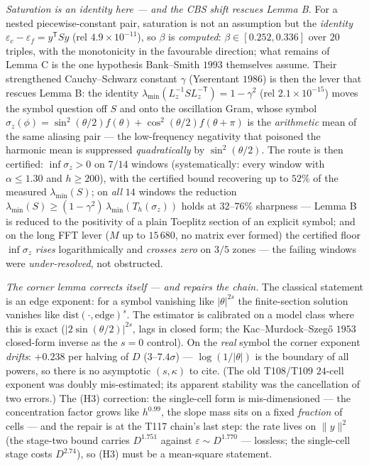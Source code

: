 \documentclass[11pt,a4paper]{article}
\begin{document}
\emph{Saturation is an identity here --- and the CBS shift rescues Lemma B.} For a nested
piecewise-constant pair, saturation is not an assumption but the \emph{identity}
$\varepsilon_c-\varepsilon_f=y^{\mathsf T}Sy$ (rel $4.9\times10^{-11}$), so $\beta$ is
\emph{computed}: $\beta\in[0.252,0.336]$ over $20$ triples, with the monotonicity in the
favourable direction; what remains of Lemma C is the one hypothesis Bank--Smith $1993$
themselves assume. Their strengthened Cauchy--Schwarz constant $\gamma$ (Yserentant $1986$) is
then the lever that rescues Lemma B: the identity
$\lambda_{\min}(L_z^{-1}SL_z^{-\mathsf T})=1-\gamma^2$ (rel $2.1\times10^{-15}$) moves the
symbol question off $S$ and onto the oscillation Gram, whose symbol
$\sigma_z(\phi)=\sin^2(\theta/2)f(\theta)+\cos^2(\theta/2)f(\theta+\pi)$ is the
\emph{arithmetic} mean of the same aliasing pair --- the low-frequency negativity that poisoned
the harmonic mean is suppressed \emph{quadratically} by $\sin^2(\theta/2)$. The route is then
certified: $\inf\sigma_z>0$ on $7/14$ windows (systematically: every window with
$\alpha\le1.30$ and $h\ge200$), with the certified bound recovering up to $52\%$ of the
measured $\lambda_{\min}(S)$; on \emph{all} $14$ windows the reduction
$\lambda_{\min}(S)\ge(1-\gamma^2)\,\lambda_{\min}(T_h(\sigma_z))$ holds at $32$--$76\%$
sharpness --- Lemma B is reduced to the positivity of a plain Toeplitz section of an explicit
symbol; and on the long FFT lever ($M$ up to $15\,680$, no matrix ever formed) the certified
floor $\inf\sigma_z$ \emph{rises} logarithmically and \emph{crosses zero} on $3/5$ zones ---
the failing windows were \emph{under-resolved}, not obstructed.

\emph{The corner lemma corrects itself --- and repairs the chain.} The classical statement is
an edge exponent: for a symbol vanishing like $|\theta|^{2s}$ the finite-section solution
vanishes like $\mathrm{dist}(\cdot,\mathrm{edge})^s$. The estimator is calibrated on a model
class where this is exact ($|2\sin(\theta/2)|^{2s}$, lags in closed form; the
Kac--Murdock--Szeg\H{o} $1953$ closed-form inverse as the $s=0$ control). On the \emph{real}
symbol the corner exponent \emph{drifts}: $+0.238$ per halving of $D$ ($3$--$7.4\sigma$) ---
$\log(1/|\theta|)$ is the boundary of all powers, so there is no asymptotic $(s,\kappa)$ to
cite. (The old T108/T109 $24$-cell exponent was doubly mis-estimated; its apparent stability
was the cancellation of two errors.) The (H3) correction: the single-cell form is
mis-dimensioned --- the concentration factor grows like $h^{0.99}$, the slope mass sits on a
fixed \emph{fraction} of cells --- and the repair is at the T117 chain's last step: the rate
lives on $\|y\|^2$ (the stage-two bound carries $D^{1.751}$ against $\varepsilon\sim D^{1.770}$
--- lossless; the single-cell stage costs $D^{2.74}$), so (H3) must be a mean-square statement.
\end{document}
